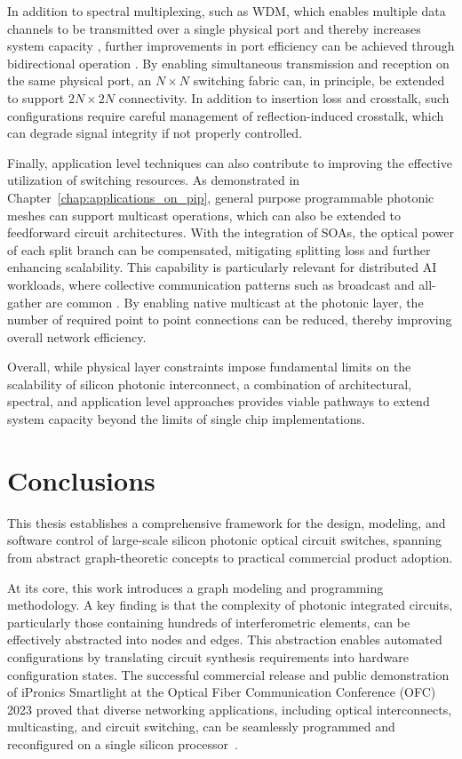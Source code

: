 In addition to spectral multiplexing, such as WDM, which enables multiple data channels to be transmitted over a single physical port and thereby increases system capacity \cite{guo2019wdm, papadimitriou2003optical},
further improvements in port efficiency can be achieved through bidirectional operation \cite{lubidirectionalcon}.
By enabling simultaneous transmission and reception on the same physical port, an $N \times N$ switching fabric can, in principle, be extended to support $2N \times 2N$ connectivity.
In addition to insertion loss and crosstalk, such configurations require careful management of reflection-induced crosstalk, which can degrade signal integrity if not properly controlled.

Finally, application level techniques can also contribute to improving the effective utilization of switching resources.
As demonstrated in Chapter~\ref{chap:applications_on_pip}, general purpose programmable photonic meshes can support multicast operations, which can also be extended to feedforward circuit architectures.
With the integration of SOAs, the optical power of each split branch can be compensated, mitigating splitting loss and further enhancing scalability.
This capability is particularly relevant for distributed AI workloads, where collective communication patterns such as broadcast and all-gather are common \cite{samadi2015optical, moritz2018ray}.
By enabling native multicast at the photonic layer, the number of required point to point connections can be reduced, thereby improving overall network efficiency.

Overall, while physical layer constraints impose fundamental limits on the scalability of silicon photonic interconnect, a combination of architectural, spectral, and application level approaches provides viable pathways to extend system capacity beyond the limits of single chip implementations.

\section{Conclusions} \label{section:conclusions}
This thesis establishes a comprehensive framework for the design, modeling, and software control of large-scale silicon photonic optical circuit switches, spanning from abstract graph-theoretic concepts to practical commercial product adoption.

At its core, this work introduces a graph modeling and programming methodology.
A key finding is that the complexity of photonic integrated circuits, particularly those containing hundreds of interferometric elements, can be effectively abstracted into nodes and edges.
This abstraction enables automated configurations by translating circuit synthesis requirements into hardware configuration states.
The successful commercial release and public demonstration of iPronics Smartlight at the Optical Fiber Communication Conference (OFC) 2023 proved that diverse networking applications, including optical interconnects, multicasting, and circuit switching, can be seamlessly programmed and reconfigured on a single silicon processor~\cite{ipronics_smartlight}.

